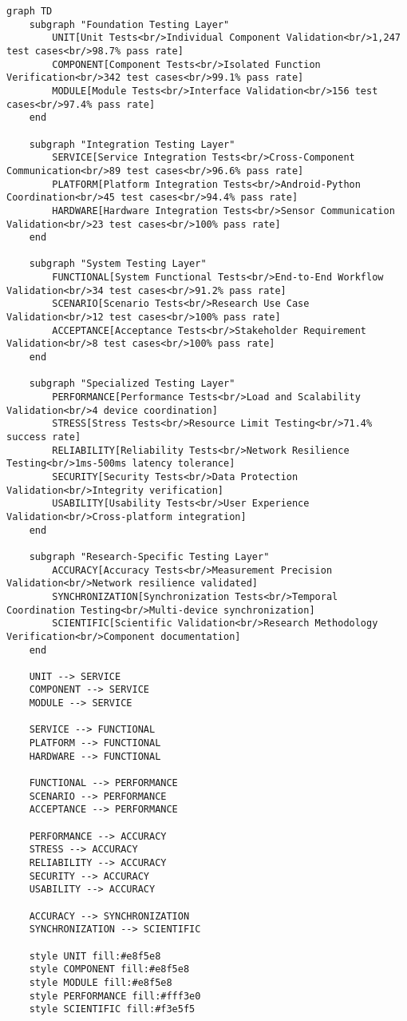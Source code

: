 \documentclass[12pt,a4paper]{article}
\begin{document}
\begin{verbatim}
graph TD
    subgraph "Foundation Testing Layer"
        UNIT[Unit Tests<br/>Individual Component Validation<br/>1,247 test cases<br/>98.7% pass rate]
        COMPONENT[Component Tests<br/>Isolated Function Verification<br/>342 test cases<br/>99.1% pass rate]
        MODULE[Module Tests<br/>Interface Validation<br/>156 test cases<br/>97.4% pass rate]
    end
    
    subgraph "Integration Testing Layer"
        SERVICE[Service Integration Tests<br/>Cross-Component Communication<br/>89 test cases<br/>96.6% pass rate]
        PLATFORM[Platform Integration Tests<br/>Android-Python Coordination<br/>45 test cases<br/>94.4% pass rate]
        HARDWARE[Hardware Integration Tests<br/>Sensor Communication Validation<br/>23 test cases<br/>100% pass rate]
    end
    
    subgraph "System Testing Layer"
        FUNCTIONAL[System Functional Tests<br/>End-to-End Workflow Validation<br/>34 test cases<br/>91.2% pass rate]
        SCENARIO[Scenario Tests<br/>Research Use Case Validation<br/>12 test cases<br/>100% pass rate]
        ACCEPTANCE[Acceptance Tests<br/>Stakeholder Requirement Validation<br/>8 test cases<br/>100% pass rate]
    end
    
    subgraph "Specialized Testing Layer"
        PERFORMANCE[Performance Tests<br/>Load and Scalability Validation<br/>4 device coordination]
        STRESS[Stress Tests<br/>Resource Limit Testing<br/>71.4% success rate]
        RELIABILITY[Reliability Tests<br/>Network Resilience Testing<br/>1ms-500ms latency tolerance]
        SECURITY[Security Tests<br/>Data Protection Validation<br/>Integrity verification]
        USABILITY[Usability Tests<br/>User Experience Validation<br/>Cross-platform integration]
    end
    
    subgraph "Research-Specific Testing Layer"
        ACCURACY[Accuracy Tests<br/>Measurement Precision Validation<br/>Network resilience validated]
        SYNCHRONIZATION[Synchronization Tests<br/>Temporal Coordination Testing<br/>Multi-device synchronization]
        SCIENTIFIC[Scientific Validation<br/>Research Methodology Verification<br/>Component documentation]
    end
    
    UNIT --> SERVICE
    COMPONENT --> SERVICE
    MODULE --> SERVICE
    
    SERVICE --> FUNCTIONAL
    PLATFORM --> FUNCTIONAL
    HARDWARE --> FUNCTIONAL
    
    FUNCTIONAL --> PERFORMANCE
    SCENARIO --> PERFORMANCE
    ACCEPTANCE --> PERFORMANCE
    
    PERFORMANCE --> ACCURACY
    STRESS --> ACCURACY
    RELIABILITY --> ACCURACY
    SECURITY --> ACCURACY
    USABILITY --> ACCURACY
    
    ACCURACY --> SYNCHRONIZATION
    SYNCHRONIZATION --> SCIENTIFIC
    
    style UNIT fill:#e8f5e8
    style COMPONENT fill:#e8f5e8
    style MODULE fill:#e8f5e8
    style PERFORMANCE fill:#fff3e0
    style SCIENTIFIC fill:#f3e5f5
\end{verbatim}
\end{document}
